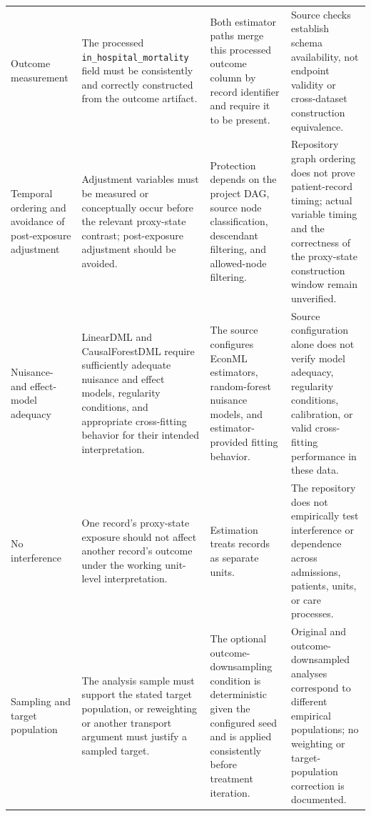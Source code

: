 \begin{longtable}{@{}L{0.16\textwidth}L{0.25\textwidth}L{0.22\textwidth}L{0.27\textwidth}@{}}
Outcome measurement & The processed \nolinkurl{in_hospital_mortality} field must be consistently and correctly constructed from the outcome artifact. & Both estimator paths merge this processed outcome column by record identifier and require it to be present. & Source checks establish schema availability, not endpoint validity or cross-dataset construction equivalence. \\
Temporal ordering and avoidance of post-exposure adjustment & Adjustment variables must be measured or conceptually occur before the relevant proxy-state contrast; post-exposure adjustment should be avoided. & Protection depends on the project DAG, source node classification, descendant filtering, and allowed-node filtering. & Repository graph ordering does not prove patient-record timing; actual variable timing and the correctness of the proxy-state construction window remain unverified. \\
Nuisance- and effect-model adequacy & LinearDML and CausalForestDML require sufficiently adequate nuisance and effect models, regularity conditions, and appropriate cross-fitting behavior for their intended interpretation. & The source configures EconML estimators, random-forest nuisance models, and estimator-provided fitting behavior. & Source configuration alone does not verify model adequacy, regularity conditions, calibration, or valid cross-fitting performance in these data. \\
No interference & One record's proxy-state exposure should not affect another record's outcome under the working unit-level interpretation. & Estimation treats records as separate units. & The repository does not empirically test interference or dependence across admissions, patients, units, or care processes. \\
Sampling and target population & The analysis sample must support the stated target population, or reweighting or another transport argument must justify a sampled target. & The optional outcome-downsampling condition is deterministic given the configured seed and is applied consistently before treatment iteration. & Original and outcome-downsampled analyses correspond to different empirical populations; no weighting or target-population correction is documented. \\
\bottomrule
\end{longtable}


